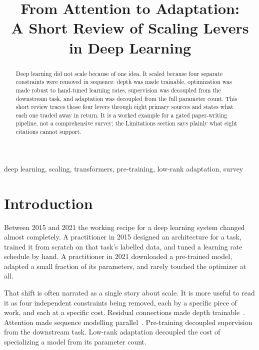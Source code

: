 \documentclass[conference]{IEEEtran}
\begin{document}
\title{From Attention to Adaptation:\\A Short Review of Scaling Levers in Deep Learning}

\author{
}

\maketitle

\begin{abstract}
Deep learning did not scale because of one idea. It scaled because four
separate constraints were removed in sequence: depth was made trainable,
optimization was made robust to hand-tuned learning rates, supervision was
decoupled from the downstream task, and adaptation was decoupled from the full
parameter count. This short review traces those four levers through eight
primary sources and states what each one traded away in return. It is a
worked example for a gated paper-writing pipeline, not a comprehensive survey;
the Limitations section says plainly what eight citations cannot support.
\end{abstract}

\begin{IEEEkeywords}
deep learning, scaling, transformers, pre-training, low-rank adaptation, survey
\end{IEEEkeywords}

\section{Introduction}
\label{sec:intro}

Between 2015 and 2021 the working recipe for a deep learning system changed
almost completely. A practitioner in 2015 designed an architecture for a task,
trained it from scratch on that task's labelled data, and tuned a learning rate
schedule by hand. A practitioner in 2021 downloaded a pre-trained model,
adapted a small fraction of its parameters, and rarely touched the optimizer at
all.

That shift is often narrated as a single story about scale. It is more useful
to read it as four independent constraints being removed, each by a specific
piece of work, and each at a specific cost. Residual connections made depth
trainable~\cite{he2015deepresiduallearningimage}. Attention made sequence
modelling parallel~\cite{vaswani2023attentionneed}. Pre-training decoupled
supervision from the downstream task. Low-rank adaptation decoupled the cost of
specializing a model from its parameter count.
\end{document}
